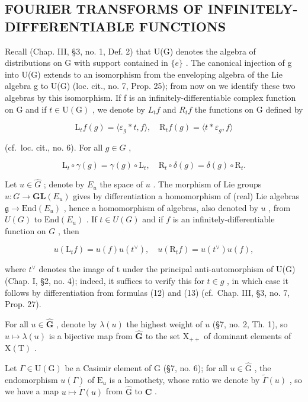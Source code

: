 \subsection{FOURIER TRANSFORMS OF INFINITELY-DIFFERENTIABLE FUNCTIONS}

Recall (Chap. III, §3, no. 1, Def. 2) that U(G) denotes the algebra of distributions on G with support contained in \(\{e\}\) . The canonical injection of g into U(G) extends to an isomorphism from the enveloping algebra of the Lie algebra g to U(G) (loc. cit., no. 7, Prop. 25); from now on we identify these two algebras by this isomorphism. If f is an infinitely-differentiable complex function on G and if \(t \in \mathrm{U}(\mathrm{G})\) , we denote by \(L_{t}f\) and \(R_{t}f\) the functions on G defined by

\[
\mathrm{L} _ {t} f (g) = \langle \varepsilon_ {g} * t, f \rangle , \quad \mathrm{R} _ {t} f (g) = \langle t * \varepsilon_ {g}, f \rangle
\]

(cf.~loc. cit., no. 6). For all \(g \in G\) ,

\[
\mathrm{L} _ {t} \circ \gamma (g) = \gamma (g) \circ \mathrm{L} _ {t}, \quad \mathrm{R} _ {t} \circ \delta (g) = \delta (g) \circ \mathrm{R} _ {t}.
\]

Let \(u \in \hat{G}\) ; denote by \(E_u\) the space of \(u\) . The morphism of Lie groups \(u: G \to \mathbf{GL}(E_u)\) gives by differentiation a homomorphism of (real) Lie algebras \(\mathfrak{g} \to \text{End}(E_u)\) , hence a homomorphism of algebras, also denoted by \(u\) , from \(U(G)\) to \(\text{End}(E_u)\) . If \(t \in U(G)\) and if \(f\) is an infinitely-differentiable function on \(G\) , then

\[
u (\mathrm{L} _ {t} f) = u (f) u (t ^ {\vee}), \quad u (\mathrm{R} _ {t} f) = u (t ^ {\vee}) u (f),\tag{14}
\]

where \(t^{\vee}\) denotes the image of t under the principal anti-automorphism of U(G) (Chap. I, §2, no. 4); indeed, it suffices to verify this for \(t \in g\) , in which case it follows by differentiation from formulas (12) and (13) (cf.~Chap. III, §3, no. 7, Prop. 27).

For all \(u \in \hat{\mathbf{G}}\) , denote by \(\lambda(u)\) the highest weight of \(u\) (§7, no. 2, Th. 1), so \(u \mapsto \lambda(u)\) is a bijective map from \(\hat{\mathbf{G}}\) to the set \(\mathrm{X}_{++}\) of dominant elements of \(\mathrm{X}(\mathrm{T})\) .

Let \(\Gamma \in \mathrm{U}(\mathrm{G})\) be a Casimir element of \(\mathrm{G}\) (§7, no. 6); for all \(u \in \hat{\mathrm{G}}\) , the endomorphism \(u(\Gamma)\) of \(\mathrm{E}_u\) is a homothety, whose ratio we denote by \(\tilde{\Gamma}(u)\) , so we have a map \(u \mapsto \tilde{\Gamma}(u)\) from \(\hat{\mathrm{G}}\) to \(\mathbf{C}\) .

